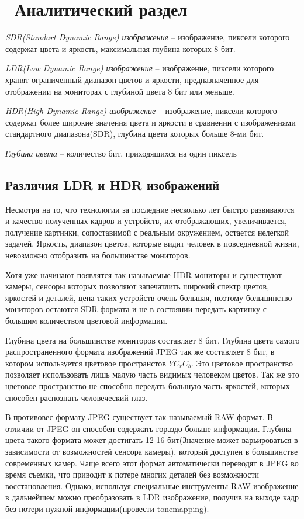 \chapter{ Аналитический раздел}
\label{cha:analysis}

\textit{SDR(Standart Dynamic Range) изображение}\cite{bib1} -- изображение, пиксели которого содержат цвета и яркость, максимальная глубина которых 8 бит.

\textit{LDR(Low Dynamic Range) изображение}\cite{bib1} -- изображение, пиксели которого хранят ограниченный диапазон цветов и яркости, предназначенное для отображении на мониторах с глубиной цвета 8 бит или меньше.

\textit{HDR(High Dynamic Range) изображение}\cite{bib2} -- изображение, пиксели которого содержат более широкие значения цвета и яркости в сравнении с изображениями стандартного диапазона(SDR), глубина цвета которых больше 8-ми бит.

\textit{Глубина цвета} -- количество бит, приходящихся на один пиксель 

\section{ Различия LDR и HDR изображений}
    
    Несмотря на то, что технологии за последние несколько лет быстро развиваются и качество полученных кадров и устройств, их отображающих, увеличивается, получение картинки, сопоставимой с реальным окружением, остается нелегкой задачей. Яркость, диапазон цветов, которые видит человек в повседневной жизни, невозможно отобразить на большинстве мониторов.

    Хотя уже начинают появлятся так называемые HDR мониторы и существуют камеры, сенсоры которых позволяют запечатлить широкий спектр цветов, яркостей и деталей, цена таких устройств очень большая, поэтому большинство мониторов остаются SDR формата и не в состоянии передать картинку с большим количеством цветовой информации.

    Глубина цвета на большинстве мониторов составляет 8 бит. Глубина цвета самого распространенного формата изображений JPEG так же составляет 8 бит, в котором используется цветовое пространстов $YC_rC_b$\cite{bib1}. Это цветовое пространство позволяет использовать лишь малую часть видимых человеком цветов. Так же это цветовое пространство не способно передать большую часть яркостей, которых способен распознать человеческий глаз.

    В противовес формату JPEG существует так называемый RAW формат. В отличии от JPEG он способен содержать гораздо больше информации. Глубина цвета такого формата может достигать 12-16 бит(Значение может варьироваться в зависимости от возможностей сенсора камеры), который доступен в большинстве современных камер. Чаще всего этот формат автоматически переводят в JPEG во время съемки, что приводит к потере многих деталей без возможности восстановления. Однако, используя специальные инструменты RAW изображение в дальнейшем можно преобразовать в LDR изображение, получив на выходе кадр без потери нужной информации(провести tonemapping)\cite{bib1}.

